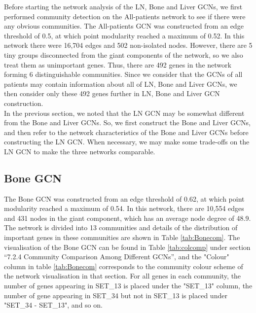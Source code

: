 \documentclass[12pt,a4paper]{report}
\begin{document}
Before starting the network analysis of the LN, Bone and Liver GCNs, we first performed community detection on the All-patients network to see if there were any obvious communities. The All-patients GCN was constructed from an edge threshold of 0.5, at which point modularity reached a maximum of 0.52. In this network there were 16,704 edges and 502 non-isolated nodes.  However, there are 5 tiny groups disconnected from the giant components of the network, so we also treat them as unimportant genes. Thus, there are 492 genes in the network forming 6 distinguishable communities. Since we consider that the GCNs of all patients may contain information about all of LN, Bone and Liver GCNs, we then consider only these 492 genes further in LN, Bone and Liver GCN construction.\\

In the previous section, we noted that the LN GCN may be somewhat different from the Bone and Liver GCNs. So, we first construct the Bone and Liver GCNs, and then refer to the network characteristics of the Bone and Liver GCNs before constructing the LN GCN. When necessary, we may make some trade-offs on the LN GCN to make the three networks comparable.\\

\subsection{Bone GCN}
The Bone GCN was constructed from an edge threshold of 0.62, at which point modularity reached a maximum of 0.54. In this network, there are 10,554 edges and 431 nodes in the giant component, which has an average node degree of 48.9. The network is divided into 13 communities and details of the distribution of important genes in these communities are shown in Table \ref{tab:Bonecom}. The visualisation of the Bone GCN can be found in Table \ref{tab:colcomp} under section “7.2.4 Community Comparison Among Different GCNs”, and the "Colour" column in table \ref{tab:Bonecom} corresponds to the community colour scheme of the network visualisation in that section. For all genes in each community, the number of genes appearing in SET\_13 is placed under the "SET\_13" column, the number of gene appearing in SET\_34 but not in SET\_13 is placed under "SET\_34 - SET\_13", and so on.
\end{document}
